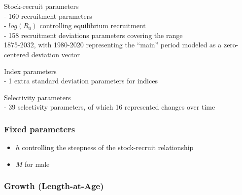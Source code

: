 \documentclass[11pt,
  english,
  a4paper,
]{article}
\begin{document}
Stock-recruit parameters\\
- 160 recruitment parameters\\
- {\(log(R_0)\)\leavevmode\tagmcend\tagstructend} controlling equilibrium recruitment\\
- 158 recruitment deviations parameters covering the range\\
1875-2032, with 1980-2020 representing the ``main'' period modeled as a zero-centered deviation vector

Index parameters\\
- 1 extra standard deviation parameters for indices

Selectivity parameters\\
- 39 selectivity parameters, of which 16 represented changes over time


\hypertarget{fixed-parameters}{%
\subsubsection{Fixed parameters}\label{fixed-parameters}}

\leavevmode\tagmcend\tagstructend


\begin{itemize}
\item

  {\(h\)\leavevmode\tagmcend\tagstructend} controlling the steepness of the stock-recruit relationship

  \tagmcend\tagstructend\tagstructend
\item

  {\(M\)\leavevmode\tagmcend\tagstructend} for male

  \tagmcend\tagstructend\tagstructend
\end{itemize}

\tagstructend


\hypertarget{growth-length-at-age}{%
\subsubsection{Growth (Length-at-Age)}\label{growth-length-at-age}}
\end{document}
